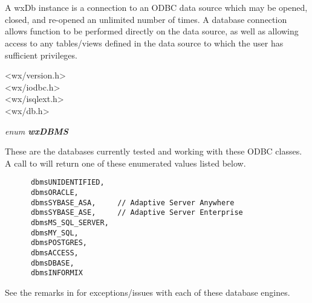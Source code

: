 \section{}\label{wxdb}

A wxDb instance is a connection to an ODBC data source which may
be opened, closed, and re-opened an unlimited number of times.  A
database connection allows function to be performed directly on the
data source, as well as allowing access to any tables/views defined in
the data source to which the user has sufficient privileges.


<wx/version.h>\\
<wx/iodbc.h>\\
<wx/isqlext.h>\\
<wx/db.h>



\label{wxdbenumsqllogstate}

{\it enum {\bf wxDBMS}}

These are the databases currently tested and working with these ODBC classes.  
A call to  will return one of these enumerated values listed below.

\begin{verbatim}
      dbmsUNIDENTIFIED,
      dbmsORACLE,
      dbmsSYBASE_ASA,     // Adaptive Server Anywhere
      dbmsSYBASE_ASE,     // Adaptive Server Enterprise
      dbmsMS_SQL_SERVER,
      dbmsMY_SQL,
      dbmsPOSTGRES,
      dbmsACCESS,
      dbmsDBASE,
      dbmsINFORMIX
\end{verbatim}

See the remarks in  for exceptions/issues with
each of these database engines.




\label{wxdbdbstatus}

